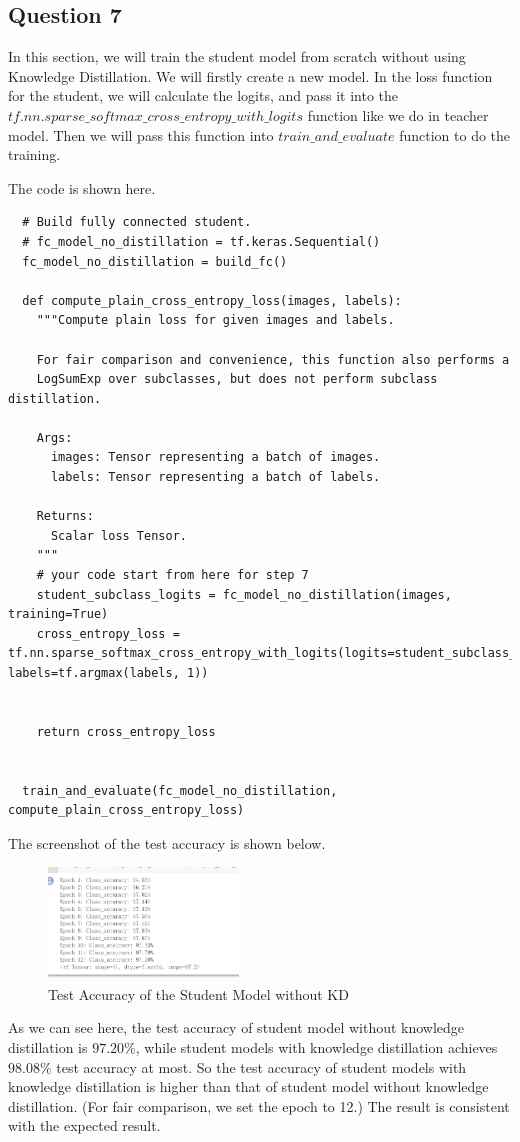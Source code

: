 \documentclass[conference]{IEEEtran}
\begin{document}
  \subsection{Question 7}
  In this section, we will train the student model from scratch without using Knowledge Distillation.
  We will firstly create a new model. In the loss function for the student, we will calculate the logits, and pass it into the $tf.nn.sparse\_softmax\_cross\_entropy\_with\_logits$ function like we do in teacher model.
  Then we will pass this function into $train\_and\_evaluate$ function to do the training.\par
  The code is shown here.
  \begin{lstlisting}
  # Build fully connected student.
  # fc_model_no_distillation = tf.keras.Sequential()
  fc_model_no_distillation = build_fc()
  
  def compute_plain_cross_entropy_loss(images, labels):
    """Compute plain loss for given images and labels.
  
    For fair comparison and convenience, this function also performs a
    LogSumExp over subclasses, but does not perform subclass distillation.
  
    Args:
      images: Tensor representing a batch of images.
      labels: Tensor representing a batch of labels.
  
    Returns:
      Scalar loss Tensor.
    """
    # your code start from here for step 7
    student_subclass_logits = fc_model_no_distillation(images, training=True)
    cross_entropy_loss = tf.nn.sparse_softmax_cross_entropy_with_logits(logits=student_subclass_logits, labels=tf.argmax(labels, 1))
  
    
    return cross_entropy_loss
  
  
  train_and_evaluate(fc_model_no_distillation, compute_plain_cross_entropy_loss)
  \end{lstlisting}
  The screenshot of the test accuracy is shown below.
  
  \begin{figure}[h] 
      \centering
      \includegraphics[width=0.45\textwidth]{./graphs/T1Q7_train.png}
      \caption{Test Accuracy of the Student Model without KD}
      \label{Fig.t1q3e}
  \end{figure}
  As we can see here, the test accuracy of student model without knowledge distillation is $97.20\%$, while student models with knowledge distillation achieves $98.08\%$ test accuracy at most.
  So the test accuracy of student models with knowledge distillation is higher than that of student model without knowledge distillation. (For fair comparison, we set the epoch to 12.) The result is consistent with the expected result.
  
\end{document}
